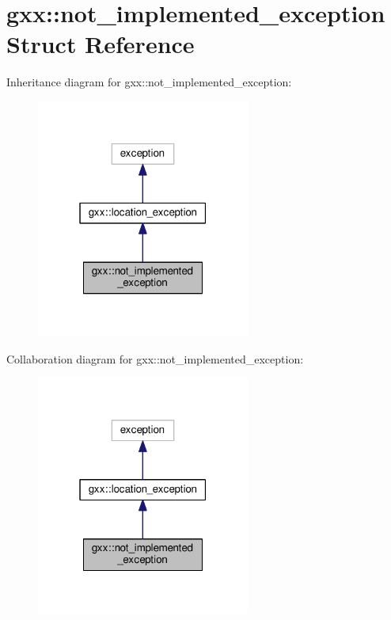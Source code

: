 \hypertarget{structgxx_1_1not__implemented__exception}{}\section{gxx\+:\+:not\+\_\+implemented\+\_\+exception Struct Reference}
\label{structgxx_1_1not__implemented__exception}


Inheritance diagram for gxx\+:\+:not\+\_\+implemented\+\_\+exception\+:
\nopagebreak
\begin{figure}[H]
\begin{center}
\leavevmode
\includegraphics[width=199pt]{structgxx_1_1not__implemented__exception__inherit__graph}
\end{center}
\end{figure}


Collaboration diagram for gxx\+:\+:not\+\_\+implemented\+\_\+exception\+:
\nopagebreak
\begin{figure}[H]
\begin{center}
\leavevmode
\includegraphics[width=199pt]{structgxx_1_1not__implemented__exception__coll__graph}
\end{center}
\end{figure}
